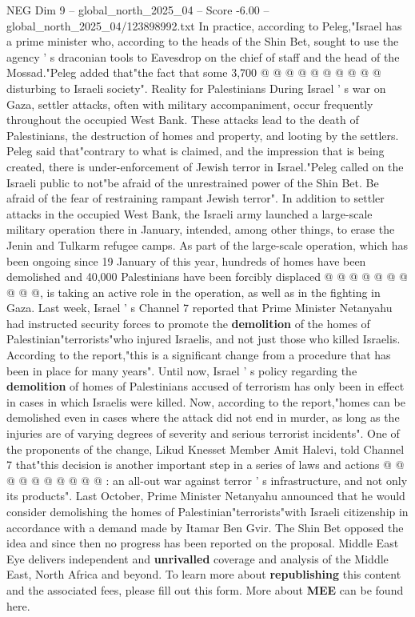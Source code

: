 \begin{textsample}{NEG Dim 9 – global\_north\_2025\_04 – Score -6.00 – global\_north\_2025\_04/123898992.txt}
In practice, according to Peleg,"Israel has a prime minister who, according to the heads of the Shin Bet, sought to use the agency ' s draconian tools to Eavesdrop on the chief of staff and the head of the Mossad."Peleg added that"the fact that some 3,700 @ @ @ @ @ @ @ @ @ @ disturbing to Israeli society".
Reality for Palestinians During Israel ' s war on Gaza, settler attacks, often with military accompaniment, occur frequently throughout the occupied West Bank.
These attacks lead to the death of Palestinians, the destruction of homes and property, and looting by the settlers.
Peleg said that"contrary to what is claimed, and the impression that is being created, there is under-enforcement of Jewish terror in Israel."Peleg called on the Israeli public to not"be afraid of the unrestrained power of the Shin Bet.
Be afraid of the fear of restraining rampant Jewish terror".
In addition to settler attacks in the occupied West Bank, the Israeli army launched a large-scale military operation there in January, intended, among other things, to erase the Jenin and Tulkarm refugee camps.
As part of the large-scale operation, which has been ongoing since 19 January of this year, hundreds of homes have been demolished and 40,000 Palestinians have been forcibly displaced @ @ @ @ @ @ @ @ @ @, is taking an active role in the operation, as well as in the fighting in Gaza.
Last week, Israel ' s Channel 7 reported that Prime Minister Netanyahu had instructed security forces to promote the \textbf{demolition} of the homes of Palestinian"terrorists"who injured Israelis, and not just those who killed Israelis.
According to the report,"this is a significant change from a procedure that has been in place for many years".
Until now, Israel ' s policy regarding the \textbf{demolition} of homes of Palestinians accused of terrorism has only been in effect in cases in which Israelis were killed.
Now, according to the report,"homes can be demolished even in cases where the attack did not end in murder, as long as the injuries are of varying degrees of severity and serious terrorist incidents".
One of the proponents of the change, Likud Knesset Member Amit Halevi, told Channel 7 that"this decision is another important step in a series of laws and actions @ @ @ @ @ @ @ @ @ @ : an all-out war against terror ' s infrastructure, and not only its products".
Last October, Prime Minister Netanyahu announced that he would consider demolishing the homes of Palestinian"terrorists"with Israeli citizenship in accordance with a demand made by Itamar Ben Gvir.
The Shin Bet opposed the idea and since then no progress has been reported on the proposal.
Middle East Eye delivers independent and \textbf{unrivalled} coverage and analysis of the Middle East, North Africa and beyond.
To learn more about \textbf{republishing} this content and the associated fees, please fill out this form.
More about \textbf{MEE} can be found here.

\end{textsample}
